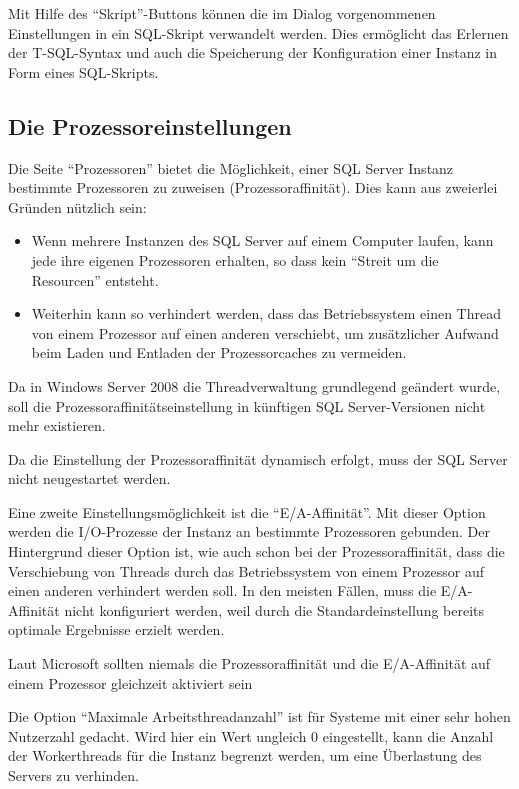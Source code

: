         Mit Hilfe des \enquote{Skript}-Buttons können die im Dialog
        vorgenommenen Einstellungen in ein SQL-Skript verwandelt werden. Dies
        ermöglicht das Erlernen der T-SQL-Syntax und auch die Speicherung der
        Konfiguration einer Instanz in Form eines SQL-Skripts.
      \subsection{Die Prozessoreinstellungen}
        Die Seite \enquote{Prozessoren} bietet die Möglichkeit, einer SQL
        Server Instanz bestimmte Prozessoren zu zuweisen (Prozessoraffinität).
        Dies kann aus zweierlei Gründen nützlich sein:
        \begin{itemize}
            \item Wenn mehrere Instanzen des SQL Server auf einem Computer
            laufen, kann jede ihre eigenen Prozessoren erhalten, so dass kein
            \enquote{Streit um die Resourcen} entsteht.
            \item Weiterhin kann so verhindert werden, dass das Betriebssystem
            einen Thread von einem Prozessor auf einen anderen verschiebt,
            um zusätzlicher Aufwand beim Laden und Entladen der Prozessorcaches
            zu vermeiden.
        \end{itemize} 
        \begin{merke}
          Da in Windows Server 2008 die Threadverwaltung grundlegend geändert
          wurde, soll die Prozessoraffinitätseinstellung in künftigen SQL
          Server-Versionen nicht mehr existieren.
        \end{merke}
        Da die Einstellung der Prozessoraffinität dynamisch erfolgt, muss der
        SQL Server nicht neugestartet werden.
        \begin{literaturinternet}
          \item \cite{ms187104}
        \end{literaturinternet}          
        
        Eine zweite Einstellungsmöglichkeit ist die \enquote{E/A-Affinität}.
        Mit dieser Option werden die I/O-Prozesse der Instanz an bestimmte
        Prozessoren gebunden. Der Hintergrund dieser Option ist, wie auch schon
        bei der Prozessoraffinität, dass die Verschiebung von Threads durch das
        Betriebssystem von einem Prozessor auf einen anderen verhindert werden
        soll. In den meisten Fällen, muss die E/A-Affinität nicht konfiguriert
        werden, weil durch die Standardeinstellung bereits optimale Ergebnisse
        erzielt werden.
        \begin{merke}
          Laut Microsoft sollten niemals die Prozessoraffinität und die
          E/A-Affinität auf einem Prozessor gleichzeit aktiviert sein
        \end{merke}
        Die Option \enquote{Maximale Arbeitsthreadanzahl} ist f\"ur Systeme mit
        einer sehr hohen Nutzerzahl gedacht. Wird hier ein Wert ungleich 0
        eingestellt, kann die Anzahl der Workerthreads f\"ur die Instanz
        begrenzt werden, um eine Überlastung des Servers zu verhinden.
        
